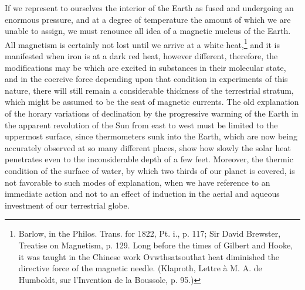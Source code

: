 If we represent to ourselves the interior of the Earth as fused and undergoing an enormous pressure, and at a degree of temperature the amount of which we are unable to assign, we must renounce all idea of a magnetic nucleus of the Earth. All magnetism is certainly not lost until we arrive at a white heat,\footnote{Barlow, in the Philos. Trans. for 1822, Pt. i., p. 117; Sir David Brewster, Treatise on Magnetism, p. 129. Long before the times of Gilbert and Hooke, it was taught in the Chinese work Ovwthsatsouthat heat diminished the directive force of the magnetic needle. (Klaproth, Lettre à M. A. de Humboldt, sur l'Invention de la Boussole, p. 95.)} and it is manifested when iron is at a dark red heat, however different, therefore, the modifications may be which are excited in substances in their molecular state, and in the coercive force depending upon that condition in experiments of this nature, there will still remain a considerable thickness of the terrestrial stratum, which might be assumed to be the seat of magnetic currents. The old explanation of the horary variations of declination by the progressive warming of the Earth in the apparent revolution of the Sun from east to west must be limited to the uppermost surface, since thermometers sunk into the Earth, which are now being accurately observed at so many different places, show how slowly the solar heat penetrates even to the inconsiderable depth of a few feet. Moreover, the thermic condition of the surface of water, by which two thirds of our planet is covered, is not favorable to such modes of explanation, when we have reference to an immediate action and not to an effect of induction in the aerial and aqueous investment of our terrestrial globe.

